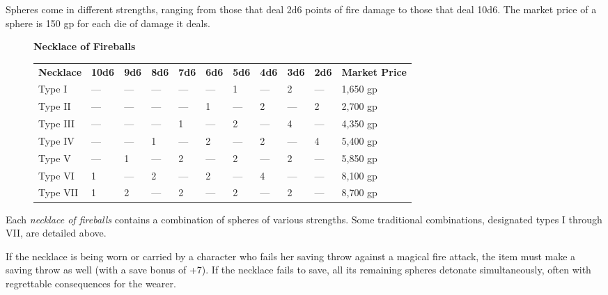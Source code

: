 Spheres come in different strengths, ranging from those that deal 2d6 points of fire damage to those that deal 10d6. The market price of a sphere is 150 gp for each die of damage it deals.
\begin{figure*}[]
\sffamily
\textbf{Necklace of Fireballs}\\
\setlength{\tabcolsep}{10pt}
\begin{tabular}{lllllllllll}
\textbf{Necklace} & \textbf{10d6} & \textbf{9d6} & \textbf{8d6} & \textbf{7d6} & \textbf{6d6} & \textbf{5d6} & \textbf{4d6} & \textbf{3d6} & \textbf{2d6} & \textbf{Market Price} \\
Type I            & ---             & ---            & ---            & ---            & ---            & 1            & ---            & 2            & ---            & 1,650 gp              \\
Type II           & ---             & ---            & ---            & ---            & 1            & ---            & 2            & ---            & 2            & 2,700 gp              \\
Type III          & ---             & ---            & ---            & 1            & ---            & 2            & ---            & 4            & ---            & 4,350 gp              \\
Type IV           & ---             & ---            & 1            & ---            & 2            & ---            & 2            & ---            & 4            & 5,400 gp              \\
Type V            & ---             & 1            & ---            & 2            & ---            & 2            & ---            & 2            & ---            & 5,850 gp              \\
Type VI           & 1             & ---            & 2            & ---            & 2            & ---            & 4            & ---            & ---            & 8,100 gp              \\
Type VII          & 1             & 2            & ---            & 2            & ---            & 2            & ---            & 2            & ---            & 8,700 gp             
\end{tabular}
\end{figure*}				
Each \textit{necklace of fireballs} contains a combination of spheres of various strengths. Some traditional combinations, designated types I through VII, are detailed above.
				
If the necklace is being worn or carried by a character who fails her saving throw against a magical fire attack, the item must make a saving throw as well (with a save bonus of +7). If the necklace fails to save, all its remaining spheres detonate simultaneously, often with regrettable consequences for the wearer. 
				
